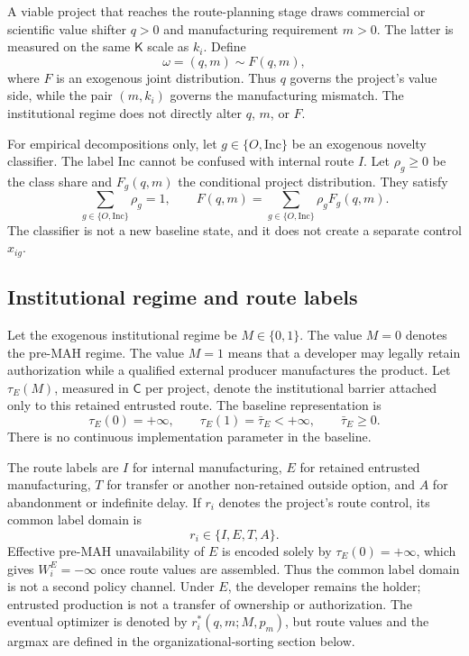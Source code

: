 A viable project that reaches the route-planning stage draws commercial or
scientific value shifter \(q>0\) and manufacturing requirement \(m>0\).  The
latter is measured on the same \(\mathsf K\) scale as \(k_i\).  Define
\begin{equation}
  \omega=(q,m)\sim F(q,m),
  \label{eq:p01-project-draw}
\end{equation}
where \(F\) is an exogenous joint distribution.  Thus \(q\) governs the
project's value side, while the pair \((m,k_i)\) governs the manufacturing
mismatch.  The institutional regime does not directly alter \(q\), \(m\), or
\(F\).

For empirical decompositions only, let
\(g\in\{O,\mathrm{Inc}\}\) be an exogenous novelty classifier.  The label
\(\mathrm{Inc}\) cannot be confused with internal route \(I\).  Let
\(\rho_g\geq0\) be the class share and \(F_g(q,m)\) the conditional project
distribution.  They satisfy
\begin{equation}
  \sum_{g\in\{O,\mathrm{Inc}\}}\rho_g=1,
  \qquad
  F(q,m)=
  \sum_{g\in\{O,\mathrm{Inc}\}}\rho_gF_g(q,m).
  \label{eq:p01-class-mixture}
\end{equation}
The classifier is not a new baseline state, and it does not create a separate
control \(x_{ig}\).

\subsection{Institutional regime and route labels}
\label{subsec:p01-institution-routes}

Let the exogenous institutional regime be \(M\in\{0,1\}\).  The value \(M=0\)
denotes the pre-MAH regime.  The value \(M=1\) means that a developer may
legally retain authorization while a qualified external producer manufactures
the product.  Let \(\tau_E(M)\), measured in \(\mathsf C\) per project, denote
the institutional barrier attached only to this retained entrusted route.  The
baseline representation is
\begin{equation}
  \tau_E(0)=+\infty,
  \qquad
  \tau_E(1)=\bar\tau_E<+\infty,
  \qquad
  \bar\tau_E\geq0.
  \label{eq:p01-institutional-wedge}
\end{equation}
There is no continuous implementation parameter in the baseline.

The route labels are \(I\) for internal manufacturing, \(E\) for retained
entrusted manufacturing, \(T\) for transfer or another non-retained outside
option, and \(A\) for abandonment or indefinite delay.  If \(r_i\) denotes the
project's route control, its common label domain is
\begin{equation}
  r_i\in\{I,E,T,A\}.
  \label{eq:p01-route-domain}
\end{equation}
Effective pre-MAH unavailability of \(E\) is encoded solely by
\(\tau_E(0)=+\infty\), which gives \(W_i^E=-\infty\) once route values are
assembled.  Thus the common label domain is not a second policy channel.
Under \(E\), the developer remains the holder; entrusted production is not a
transfer of ownership or authorization.  The eventual optimizer is denoted by
\(r_i^*(q,m;M,p_m)\), but route values and the argmax are defined in the
organizational-sorting section below.

